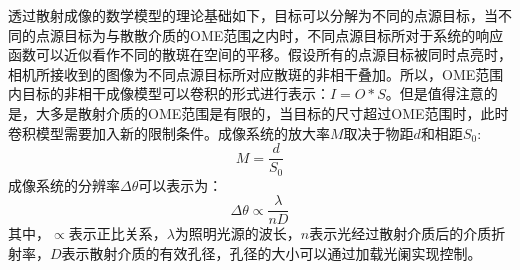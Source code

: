 透过散射成像的数学模型的理论基础如下，目标可以分解为不同的点源目标，当不同的点源目标为与散散介质的OME范围之内时，不同点源目标所对于系统的响应函数可以近似看作不同的散斑在空间的平移。假设所有的点源目标被同时点亮时，相机所接收到的图像为不同点源目标所对应散斑的非相干叠加。所以，OME范围内目标的非相干成像模型可以卷积的形式进行表示：$I = O*S$。但是值得注意的是，大多是散射介质的OME范围是有限的，当目标的尺寸超过OME范围时，此时卷积模型需要加入新的限制条件。成像系统的放大率$M$取决于物距$d$和相距$S_{0}$:
\begin{equation}
    M = \frac{d}{S_{0}}
\label{eq:magnification_imgaing_system}
\end{equation}
成像系统的分辨率$\Delta \theta $可以表示为：
\begin{equation}
    \Delta \theta   \propto \frac{\lambda}{nD}
\label{eq:angleresolution_imgaing_system}
\end{equation}
其中，$\propto$表示正比关系，$\lambda$为照明光源的波长，$n$表示光经过散射介质后的介质折射率，$D$表示散射介质的有效孔径，孔径的大小可以通过加载光阑实现控制。

